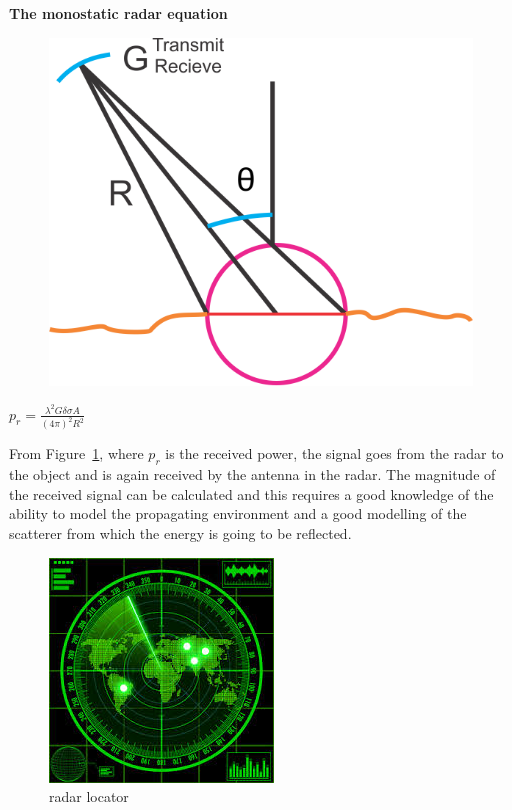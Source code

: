 \textbf{The monostatic radar equation}
\begin{figure}[h]
\centering
\includegraphics[scale=0.4]{./graphics/new1}
\label{fig:new1}
\caption{}
\end{figure}
\begin{center}
$p_{r}= \frac{\lambda^{2} G \delta \sigma A}{(4\pi)^{2}R^{2}}$
\end{center}

From Figure~\ref {fig:new1}, where $p_{r}$ is the received power, the signal goes from the radar to the object and is again received by the antenna in the radar. The magnitude of the received signal can be calculated and this requires a good knowledge of the ability to model the propagating environment and a good modelling of the scatterer from which the energy is going to be reflected.\\

\begin{figure}[h]
\centering
\includegraphics[scale=0.5]{./graphics/Radarlocator}
\caption{radar locator}
\label{fig:radarlocator}
\end{figure}

